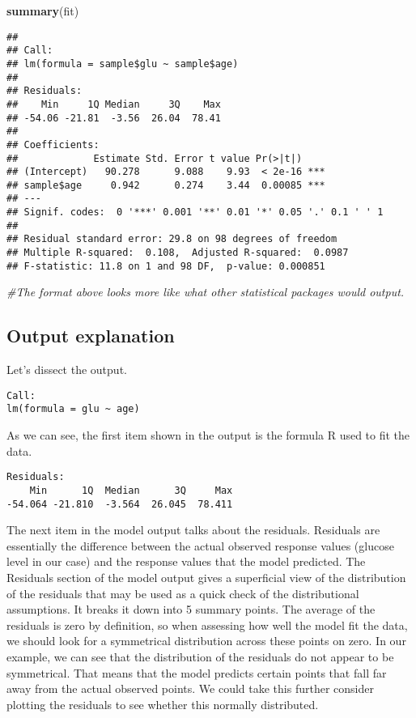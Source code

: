 \documentclass[]{book}
\newenvironment{Shaded}{\begin{snugshade}}{\end{snugshade}}
\newcommand{\KeywordTok}[1]{\textcolor[rgb]{0.13,0.29,0.53}{\textbf{#1}}}
\newcommand{\CommentTok}[1]{\textcolor[rgb]{0.56,0.35,0.01}{\textit{#1}}}
\newcommand{\NormalTok}[1]{#1}
\theoremstyle{definition}
\theoremstyle{definition}
\theoremstyle{definition}
\theoremstyle{remark}
\begin{document}
\begin{Shaded}
\begin{Highlighting}[]
\KeywordTok{summary}\NormalTok{(fit)}
\end{Highlighting}
\end{Shaded}

\begin{verbatim}
## 
## Call:
## lm(formula = sample$glu ~ sample$age)
## 
## Residuals:
##    Min     1Q Median     3Q    Max 
## -54.06 -21.81  -3.56  26.04  78.41 
## 
## Coefficients:
##             Estimate Std. Error t value Pr(>|t|)    
## (Intercept)   90.278      9.088    9.93  < 2e-16 ***
## sample$age     0.942      0.274    3.44  0.00085 ***
## ---
## Signif. codes:  0 '***' 0.001 '**' 0.01 '*' 0.05 '.' 0.1 ' ' 1
## 
## Residual standard error: 29.8 on 98 degrees of freedom
## Multiple R-squared:  0.108,  Adjusted R-squared:  0.0987 
## F-statistic: 11.8 on 1 and 98 DF,  p-value: 0.000851
\end{verbatim}

\begin{Shaded}
\begin{Highlighting}[]
\CommentTok{#The format above looks more like what other statistical packages would output. }
\end{Highlighting}
\end{Shaded}

\subsection{Output explanation}\label{output-explanation}

Let's dissect the output.

\begin{verbatim}
Call:
lm(formula = glu ~ age)
\end{verbatim}

As we can see, the first item shown in the output is the formula R used
to fit the data.

\begin{verbatim}
Residuals:
    Min      1Q  Median      3Q     Max 
-54.064 -21.810  -3.564  26.045  78.411 
\end{verbatim}

The next item in the model output talks about the residuals. Residuals
are essentially the difference between the actual observed response
values (glucose level in our case) and the response values that the
model predicted. The Residuals section of the model output gives a
superficial view of the distribution of the residuals that may be used
as a quick check of the distributional assumptions. It breaks it down
into 5 summary points. The average of the residuals is zero by
definition, so when assessing how well the model fit the data, we should
look for a symmetrical distribution across these points on zero. In our
example, we can see that the distribution of the residuals do not appear
to be symmetrical. That means that the model predicts certain points
that fall far away from the actual observed points. We could take this
further consider plotting the residuals to see whether this normally
distributed.
\end{document}
